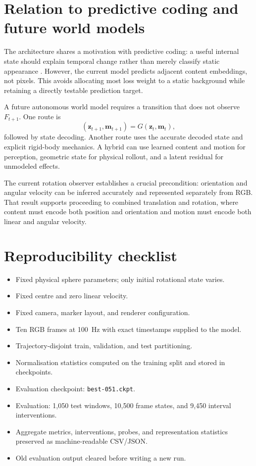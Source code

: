 \documentclass[11pt,a4paper]{article}
\newcommand{\vect}[1]{\mathbf{#1}}
\begin{document}
\section{Relation to predictive coding and future world models}
The architecture shares a motivation with predictive coding: a useful internal state should explain temporal change rather than merely classify static appearance \citep{lotter2016prednet}. However, the current model predicts adjacent content embeddings, not pixels. This avoids allocating most loss weight to a static background while retaining a directly testable prediction target.

A future autonomous world model requires a transition that does not observe $F_{t+1}$. One route is
\begin{equation}
(\vect z_{t+1},\vect m_{t+1})=G(\vect z_t,\vect m_t),
\end{equation}
followed by state decoding. Another route uses the accurate decoded state and explicit rigid-body mechanics. A hybrid can use learned content and motion for perception, geometric state for physical rollout, and a latent residual for unmodeled effects.

The current rotation observer establishes a crucial precondition: orientation and angular velocity can be inferred accurately and represented separately from RGB. That result supports proceeding to combined translation and rotation, where content must encode both position and orientation and motion must encode both linear and angular velocity.

\section{Reproducibility checklist}
\begin{itemize}[leftmargin=*]
\item Fixed physical sphere parameters; only initial rotational state varies.
\item Fixed centre and zero linear velocity.
\item Fixed camera, marker layout, and renderer configuration.
\item Ten RGB frames at \SI{100}{Hz} with exact timestamps supplied to the model.
\item Trajectory-disjoint train, validation, and test partitioning.
\item Normalisation statistics computed on the training split and stored in checkpoints.
\item Evaluation checkpoint: \texttt{best-051.ckpt}.
\item Evaluation: 1,050 test windows, 10,500 frame states, and 9,450 interval interventions.
\item Aggregate metrics, interventions, probes, and representation statistics preserved as machine-readable CSV/JSON.
\item Old evaluation output cleared before writing a new run.
\end{itemize}
\end{document}
